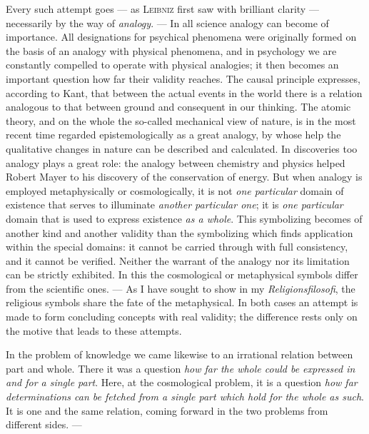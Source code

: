 \documentclass[12pt,a4paper]{book}
\newcommand{\opage}[1]{\marginnote{\footnotesize\textit{[#1]}}}
\begin{document}
Every such attempt goes --- as \textsc{Leibniz} first saw with brilliant clarity
--- necessarily by the way of \emph{analogy}. --- In all science analogy can
become of importance. All designations for psychical phenomena were originally
formed on the basis of an analogy with physical phenomena, and in psychology we
are constantly compelled to operate with physical analogies; it then becomes an
important question how far their validity reaches. The causal principle
expresses, according to Kant, that between the actual events in the world there
is a relation analogous to that between ground and consequent in our thinking.
The atomic theory, and on the whole the so-called mechanical view of nature, is
in the most recent time regarded epistemologically as a great analogy, by whose
help the qualitative changes in nature can be described and calculated. \opage{56}In
discoveries too analogy plays a great role: the analogy between chemistry and
physics helped Robert Mayer to his discovery of the conservation of energy. But
when analogy is employed metaphysically or cosmologically, it is not \emph{one
particular} domain of existence that serves to illuminate \emph{another
particular one}; it is \emph{one particular} domain that is used to express
existence \emph{as a whole}. This symbolizing becomes of another kind and another
validity than the symbolizing which finds application within the special domains:
it cannot be carried through with full consistency, and it cannot be verified.
Neither the warrant of the analogy nor its limitation can be strictly exhibited.
In this the cosmological or metaphysical symbols differ from the scientific ones.
--- As I have sought to show in my \textit{Religionsfilosofi}, the religious
symbols share the fate of the metaphysical. In both cases an attempt is made to
form concluding concepts with real validity; the difference rests only on the
motive that leads to these attempts.

In the problem of knowledge we came likewise to an irrational relation between
part and whole. There it was a question \emph{how far the whole could be
expressed in and for a single part}. Here, at the cosmological problem, it is a
question \emph{how far determinations can be fetched from a single part which
hold for the whole as such}. It is one and the same relation, coming forward in
the two problems from different sides. ---
\end{document}
